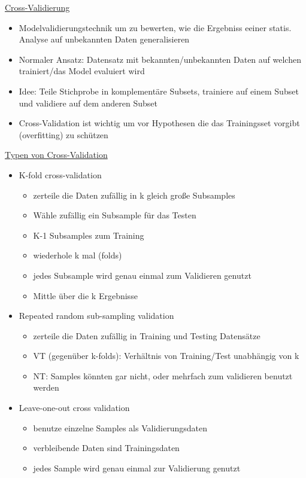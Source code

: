 \documentclass[a4paper,10pt,oneside]{article}
\begin{document}
\underline{Cross-Validierung} \\
	\begin{itemize}
		\item Modelvalidierungstechnik um zu bewerten, wie die Ergebniss eeiner statis. Analyse auf unbekannten Daten generalisieren
		\item Normaler Ansatz: Datensatz mit bekannten/unbekannten Daten auf welchen trainiert/das Model evaluiert wird
		\item Idee: Teile Stichprobe in komplementäre Subsets, trainiere auf einem Subset und validiere auf dem anderen Subset
		\item Cross-Validation ist wichtig um vor Hypothesen die das Trainingsset vorgibt (overfitting) zu schützen		
	\end{itemize}	 		
	
\underline{Typen von Cross-Validation} \\
	\begin{itemize}
		\item K-fold cross-validation
			\begin{itemize}
				\item zerteile die Daten zufällig in k gleich große Subsamples
				\item Wähle zufällig ein Subsample für das Testen
				\item K-1 Subsamples zum Training 
				\item wiederhole k mal (folds)
				\item jedes Subsample wird genau einmal zum Validieren genutzt
				\item Mittle über die k Ergebnisse
			\end{itemize}
		\item Repeated random sub-sampling validation
			\begin{itemize}
				\item zerteile die Daten zufällig in Training und Testing Datensätze
				\item VT (gegenüber k-folds): Verhältnis von Training/Test unabhängig von k\\
				\item NT: Samples könnten gar nicht, oder mehrfach zum validieren benutzt werden
			\end{itemize}
		\item Leave-one-out cross validation
			\begin{itemize}
				\item benutze einzelne Samples als Validierungsdaten
				\item verbleibende Daten sind Trainingsdaten
				\item jedes Sample wird genau einmal zur Validierung genutzt
			\end{itemize}
	\end{itemize}
 		
\end{document}
